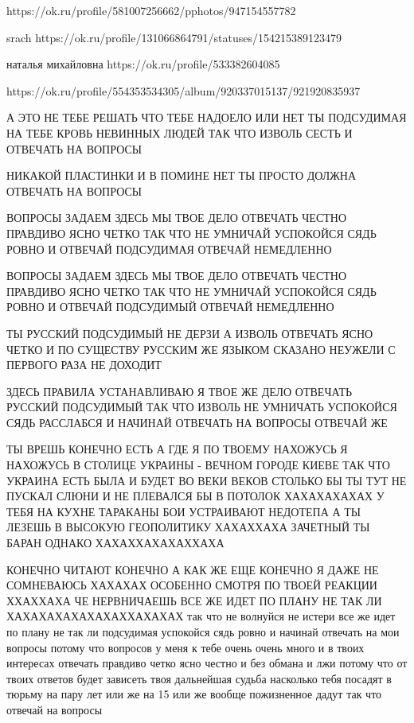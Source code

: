  
 
 
 
 

https://ok.ru/profile/581007256662/pphotos/947154557782

srach
https://ok.ru/profile/131066864791/statuses/154215389123479

наталья михайловна
https://ok.ru/profile/533382604085

https://ok.ru/profile/554353534305/album/920337015137/921920835937

А ЭТО НЕ ТЕБЕ РЕШАТЬ ЧТО ТЕБЕ НАДОЕЛО ИЛИ НЕТ ТЫ ПОДСУДИМАЯ НА ТЕБЕ КРОВЬ
НЕВИННЫХ ЛЮДЕЙ ТАК ЧТО ИЗВОЛЬ СЕСТЬ И ОТВЕЧАТЬ НА ВОПРОСЫ

НИКАКОЙ ПЛАСТИНКИ И В ПОМИНЕ НЕТ ТЫ ПРОСТО ДОЛЖНА ОТВЕЧАТЬ НА ВОПРОСЫ

ВОПРОСЫ ЗАДАЕМ ЗДЕСЬ МЫ ТВОЕ ДЕЛО ОТВЕЧАТЬ ЧЕСТНО ПРАВДИВО ЯСНО ЧЕТКО ТАК ЧТО
НЕ УМНИЧАЙ УСПОКОЙСЯ СЯДЬ РОВНО И ОТВЕЧАЙ ПОДСУДИМАЯ ОТВЕЧАЙ НЕМЕДЛЕННО

ВОПРОСЫ ЗАДАЕМ ЗДЕСЬ МЫ ТВОЕ ДЕЛО ОТВЕЧАТЬ ЧЕСТНО ПРАВДИВО ЯСНО ЧЕТКО ТАК ЧТО
НЕ УМНИЧАЙ УСПОКОЙСЯ СЯДЬ РОВНО И ОТВЕЧАЙ ПОДСУДИМЫЙ ОТВЕЧАЙ НЕМЕДЛЕННО

ТЫ РУССКИЙ ПОДСУДИМЫЙ НЕ ДЕРЗИ А ИЗВОЛЬ ОТВЕЧАТЬ ЯСНО ЧЕТКО И ПО СУЩЕСТВУ
РУССКИМ ЖЕ ЯЗЫКОМ СКАЗАНО НЕУЖЕЛИ С ПЕРВОГО РАЗА НЕ ДОХОДИТ

ЗДЕСЬ ПРАВИЛА УСТАНАВЛИВАЮ Я ТВОЕ ЖЕ ДЕЛО ОТВЕЧАТЬ РУССКИЙ ПОДСУДИМЫЙ ТАК ЧТО
ИЗВОЛЬ НЕ УМНИЧАТЬ УСПОКОЙСЯ СЯДЬ РАССЛАБСЯ И НАЧИНАЙ ОТВЕЧАТЬ НА ВОПРОСЫ
ОТВЕЧАЙ ЖЕ

ТЫ ВРЕШЬ КОНЕЧНО ЕСТЬ А ГДЕ Я ПО ТВОЕМУ НАХОЖУСЬ Я НАХОЖУСЬ В СТОЛИЦЕ УКРАИНЫ -
ВЕЧНОМ ГОРОДЕ КИЕВЕ ТАК ЧТО УКРАИНА ЕСТЬ БЫЛА И БУДЕТ ВО ВЕКИ ВЕКОВ СТОЛЬКО БЫ
ТЫ ТУТ НЕ ПУСКАЛ СЛЮНИ И НЕ ПЛЕВАЛСЯ БЫ В ПОТОЛОК ХАХАХАХАХАХ У ТЕБЯ НА КУХНЕ
ТАРАКАНЫ БОИ УСТРАИВАЮТ НЕДОТЕПА А ТЫ ЛЕЗЕШЬ В ВЫСОКУЮ ГЕОПОЛИТИКУ ХАХАХХАХА
ЗАЧЕТНЫЙ ТЫ БАРАН ОДНАКО ХАХАХХАХАХАХХАХА

КОНЕЧНО ЧИТАЮТ КОНЕЧНО А КАК ЖЕ ЕЩЕ КОНЕЧНО Я ДАЖЕ НЕ СОМНЕВАЮСЬ ХАХАХАХ
ОСОБЕННО СМОТРЯ ПО ТВОЕЙ РЕАКЦИИ ХХАХХАХА ЧЕ НЕРВНИЧАЕШЬ ВСЕ ЖЕ ИДЕТ ПО ПЛАНУ
НЕ ТАК ЛИ ХАХАХАХАХАХАХАХХАХАХАХ так что не волнуйся не истери все же идет по плану не так 
ли подсудимая успокойся сядь ровно и начинай отвечать на мои вопросы потому что вопросов у меня к тебе 
очень очень много и в твоих интересах отвечать правдиво четко ясно честно и без обмана и лжи
потому что от твоих ответов будет зависеть твоя дальнейшая судьба насколько тебя посадят в тюрьму
на пару лет или же на 15 или же вообще пожизненное дадут так что отвечай на вопросы

